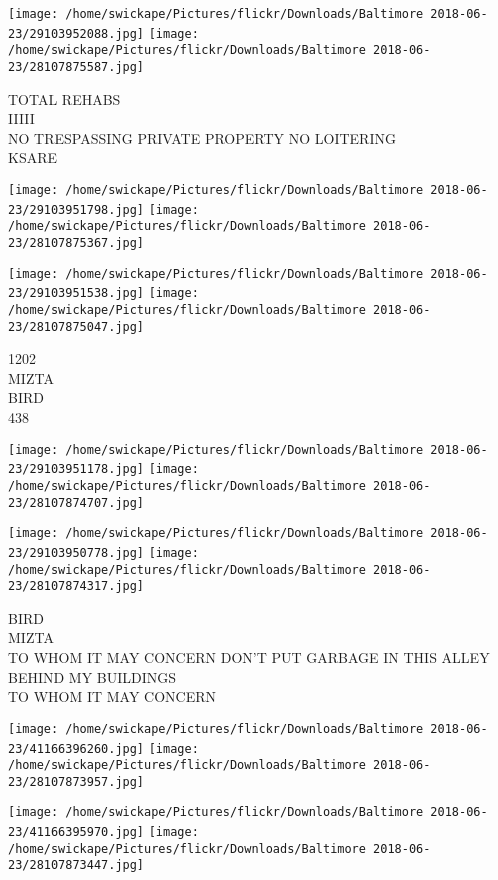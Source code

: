 \documentclass[10pt,letterpaper]{article}
\begin{document}
\texttt{[image: /home/swickape/Pictures/flickr/Downloads/Baltimore 2018-06-23/29103952088.jpg]}
\texttt{[image: /home/swickape/Pictures/flickr/Downloads/Baltimore 2018-06-23/28107875587.jpg]}

TOTAL REHABS\\
IIIII\\
NO TRESPASSING PRIVATE PROPERTY NO LOITERING\\
KSARE\\
\pagebreak

\texttt{[image: /home/swickape/Pictures/flickr/Downloads/Baltimore 2018-06-23/29103951798.jpg]}
\texttt{[image: /home/swickape/Pictures/flickr/Downloads/Baltimore 2018-06-23/28107875367.jpg]}

\texttt{[image: /home/swickape/Pictures/flickr/Downloads/Baltimore 2018-06-23/29103951538.jpg]}
\texttt{[image: /home/swickape/Pictures/flickr/Downloads/Baltimore 2018-06-23/28107875047.jpg]}

1202\\
MIZTA\\
BIRD\\
438\\
\pagebreak

\texttt{[image: /home/swickape/Pictures/flickr/Downloads/Baltimore 2018-06-23/29103951178.jpg]}
\texttt{[image: /home/swickape/Pictures/flickr/Downloads/Baltimore 2018-06-23/28107874707.jpg]}

\texttt{[image: /home/swickape/Pictures/flickr/Downloads/Baltimore 2018-06-23/29103950778.jpg]}
\texttt{[image: /home/swickape/Pictures/flickr/Downloads/Baltimore 2018-06-23/28107874317.jpg]}

BIRD\\
MIZTA\\
TO WHOM IT MAY CONCERN DON'T PUT GARBAGE IN THIS ALLEY BEHIND MY BUILDINGS\\
TO WHOM IT MAY CONCERN\\
\pagebreak

\texttt{[image: /home/swickape/Pictures/flickr/Downloads/Baltimore 2018-06-23/41166396260.jpg]}
\texttt{[image: /home/swickape/Pictures/flickr/Downloads/Baltimore 2018-06-23/28107873957.jpg]}

\texttt{[image: /home/swickape/Pictures/flickr/Downloads/Baltimore 2018-06-23/41166395970.jpg]}
\texttt{[image: /home/swickape/Pictures/flickr/Downloads/Baltimore 2018-06-23/28107873447.jpg]}
\end{document}
